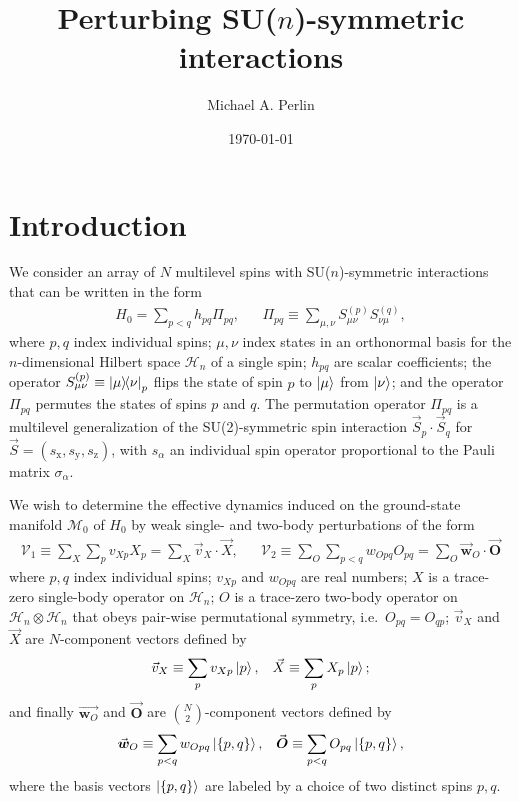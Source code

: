 \documentclass[nofootinbib,notitlepage,11pt]{revtex4-2}
\newcommand{\p}[1]{\left(#1\right)} %
\renewcommand{\set}[1]{\left\{#1\right\}} %
\renewcommand{\c}{\cdot} %
\newcommand{\m}{\bm} %
\renewcommand{\v}{\vec} %
\newcommand{\1}{\mathds{1}}
\newcommand{\x}{\text{x}}
\newcommand{\y}{\text{y}}
\newcommand{\z}{\text{z}}
\renewcommand{\H}{\mathcal{H}}
\newcommand{\M}{\mathcal{M}}
\newcommand{\V}{\mathcal{V}}
\begin{document}
\title{Perturbing SU($n$)-symmetric interactions}%
\author{Michael A. Perlin}%
\date{\today}

\maketitle

\tableofcontents

\section{Introduction}

We consider an array of $N$ multilevel spins with SU($n$)-symmetric
interactions that can be written in the form
\begin{align}
  H_0 = \sum_{p<q} h_{pq} \Pi_{pq},
  &&
  \Pi_{pq} \equiv \sum_{\mu,\nu} S_{\mu\nu}^{(p)} S_{\nu\mu}^{(q)},
  \label{eq:ints}
\end{align}
where $p,q$ index individual spins; $\mu,\nu$ index states in an
orthonormal basis for the $n$-dimensional Hilbert space $\H_n$ of a
single spin; $h_{pq}$ are scalar coefficients; the operator
$S_{\mu\nu}^{(p)}\equiv\op{\mu}{\nu}_p$ flips the state of spin $p$ to
$\ket\mu$ from $\ket\nu$; and the operator $\Pi_{pq}$ permutes the
states of spins $p$ and $q$.  The permutation operator $\Pi_{pq}$ is a
multilevel generalization of the SU(2)-symmetric spin interaction
$\v S_p\c\v S_q$ for $\v S=\p{s_\x,s_\y,s_\z}$, with $s_\alpha$ an
individual spin operator proportional to the Pauli matrix
$\sigma_\alpha$.

We wish to determine the effective dynamics induced on the
ground-state manifold $\M_0$ of $H_0$ by weak single- and two-body
perturbations of the form
\begin{align}
  \V_1 \equiv \sum_X \sum_p v_{Xp} X_p = \sum_X \v v_X\c\v X,
  &&
  \V_2 \equiv \sum_O \sum_{p<q} w_{Opq} O_{pq}
  = \sum_O \v{\m w}_O\c \v{\m O}
  \label{eq:perturbations}
\end{align}
where $p,q$ index individual spins; $v_{Xp}$ and $w_{Opq}$ are real
numbers; $X$ is a trace-zero single-body operator on $\H_n$; $O$ is a
trace-zero two-body operator on $\H_n\otimes\H_n$ that obeys pair-wise
permutational symmetry, i.e.~$O_{pq}=O_{qp}$; $\v v_X$ and $\v X$ are
$N$-component vectors defined by
\begin{align}
  \v v_X \equiv \sum_p v_{Xp} \ket{p},
  &&
  \v X \equiv \sum_p X_p \ket{p};
\end{align}
and finally $\v{\m w_O}$ and $\v{\m O}$ are ${N \choose 2}$-component
vectors defined by
\begin{align}
  \v{\m w}_O \equiv \sum_{p<q} w_{Opq} \ket{\set{p,q}},
  &&
  \v{\m O} \equiv \sum_{p<q} O_{pq} \ket{\set{p,q}},
\end{align}
where the basis vectors $\ket{\set{p,q}}$ are labeled by a choice of
two distinct spins $p,q$.
\end{document}
